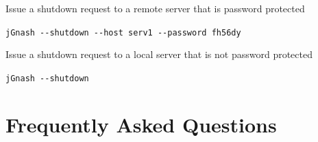 \documentclass[letterpaper,12pt]{book}
\begin{document}
    Issue a shutdown request to a remote server that is password protected
    \begin{mdframed}[style=info]
        \texttt{jGnash -{}-shutdown -{}-host serv1 -{}-password fh56dy}
    \end{mdframed}


    Issue a shutdown request to a local server that is not password protected
    \begin{mdframed}[style=info]
        \texttt{jGnash -{}-shutdown}
    \end{mdframed}

    \chapter{Frequently Asked Questions}\label{ch:frequently-asked-questions}
\end{document}
